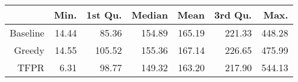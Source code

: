 \begin{table}[ht]
\centering
\begin{tabular}{rrrrrrr}
  \hline
 & Min. & 1st Qu. & Median & Mean & 3rd Qu. & Max. \\ 
  \hline
Baseline & 14.44 & 85.36 & 154.89 & 165.19 & 221.33 & 448.28 \\ 
  Greedy & 14.55 & 105.52 & 155.36 & 167.14 & 226.65 & 475.99 \\ 
  TFPR & 6.31 & 98.77 & 149.32 & 163.20 & 217.90 & 544.13 \\ 
   \hline
\end{tabular}
\end{table}
